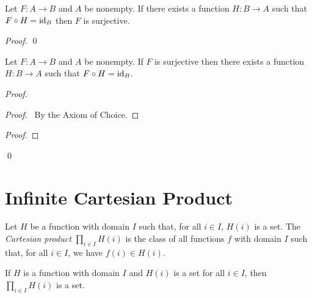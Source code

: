 \begin{theorem}
    Let $F : A \rightarrow B$ and $A$ be nonempty. If there exists a function
    $H : B \rightarrow A$ such that $F \circ H = \mathrm{id}_{B}$ then $F$
    is surjective.
\end{theorem}

\begin{proof}
    \pf
    \qed
\end{proof}

\begin{theorem}[Choice]
    Let $F : A \rightarrow B$ and $A$ be nonempty. If $F$ is surjective
    then there exists a function $H : B \rightarrow A$ such that $F \circ H = \mathrm{id}_{B}$.
\end{theorem}

\begin{proof}
    \pf
    \begin{proof}
        \pf\ By the Axiom of Choice.
    \end{proof}
    \begin{proof}
    \end{proof}
    \qed
\end{proof}

\section{Infinite Cartesian Product}

\begin{definition}
    Let $H$ be a function with domain $I$ such that, for all $i \in I$,
    $H(i)$ is a set. The \emph{Cartesian product}
    $\prod_{i \in I} H(i)$ is the class of all functions $f$ with domain $I$
    such that, for all $i \in I$, we have $f(i) \in H(i)$.
\end{definition}

\begin{theorem}
    If $H$ is a function with domain $I$ and $H(i)$ is a set for all $i \in I$, then $\prod_{i \in I} H(i)$ is a set.
\end{theorem}


